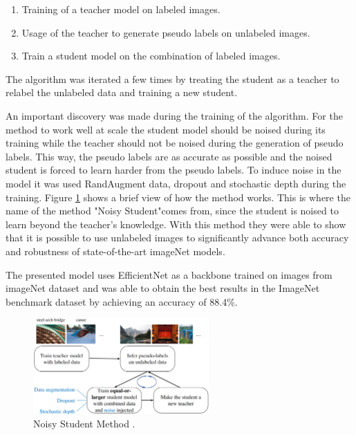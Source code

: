 \begin{enumerate}
    \item Training of a teacher model on labeled images.
    \item Usage of the teacher to generate pseudo labels on unlabeled images.
    \item Train a student model on the combination of labeled images.
\end{enumerate}

\par The algorithm was iterated a few times by treating the student as a teacher to relabel the unlabeled data and training a new student.

\par An important discovery was made during the training of the algorithm. For the method to work well at scale the student model should be noised during its training while the teacher should not be noised during the generation of pseudo labels. This way, the pseudo labels are as accurate as possible and the noised student is forced to learn harder from the pseudo labels. To induce noise in the model it was used RandAugment data, dropout and stochastic depth during the training. Figure \ref{fig:noisestudent} shows a brief view of how the method works. This is where the name of the method "Noisy Student"comes from, since the student is noised to learn beyond the teacher's knowledge. With this method they were able to show that it is possible to use unlabeled images to significantly advance both accuracy and robustness of state-of-the-art imageNet models.
\par The presented model uses EfficientNet as a backbone trained on images from imageNet dataset and was able to obtain the best results in the ImageNet benchmark dataset by achieving an accuracy of 88.4\%.



\begin{figure}[H]
    \centering
    \captionsetup{justification=centering}
    \includegraphics[width=0.6\textwidth]{Sections/2StateOfTheArt/2_images/noisy_student.png}
    \caption[Noisy Student Method]{Noisy Student Method \cite{Xie2019}.} 
    \label{fig:noisestudent}
\end{figure}

